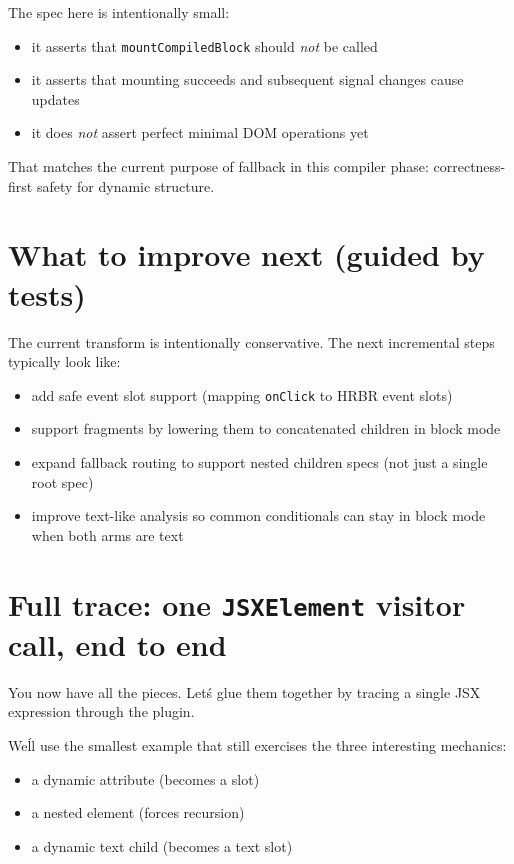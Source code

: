 The spec here is intentionally small:

\begin{itemize}
\item it asserts that \texttt{mountCompiledBlock} should \emph{not} be called
\item it asserts that mounting succeeds and subsequent signal changes cause updates
\item it does \emph{not} assert perfect minimal DOM operations yet
\end{itemize}

That matches the current purpose of fallback in this compiler phase: correctness-first safety for dynamic structure.

\section{What to improve next (guided by tests)}

The current transform is intentionally conservative.
The next incremental steps typically look like:

\begin{itemize}
\item add safe event slot support (mapping \texttt{onClick} to HRBR event slots)
\item support fragments by lowering them to concatenated children in block mode
\item expand fallback routing to support nested children specs (not just a single root spec)
\item improve text-like analysis so common conditionals can stay in block mode when both arms are text
\end{itemize}

\section{Full trace: one \texttt{JSXElement} visitor call, end to end}

You now have all the pieces.
Let\'s glue them together by tracing a single JSX expression through the plugin.

We\'ll use the smallest example that still exercises the three interesting mechanics:

\begin{itemize}
\item a dynamic attribute (becomes a slot)
\item a nested element (forces recursion)
\item a dynamic text child (becomes a text slot)
\end{itemize}

